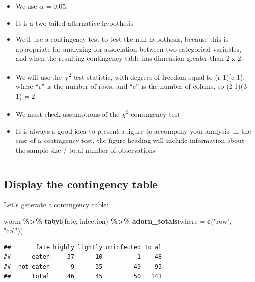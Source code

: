 \documentclass[
]{book}
\newenvironment{Shaded}{\begin{snugshade}}{\end{snugshade}}
\newcommand{\AttributeTok}[1]{\textcolor[rgb]{0.13,0.29,0.53}{#1}}
\newcommand{\FunctionTok}[1]{\textcolor[rgb]{0.13,0.29,0.53}{\textbf{#1}}}
\newcommand{\NormalTok}[1]{#1}
\newcommand{\SpecialCharTok}[1]{\textcolor[rgb]{0.81,0.36,0.00}{\textbf{#1}}}
\newcommand{\StringTok}[1]{\textcolor[rgb]{0.31,0.60,0.02}{#1}}
\providecommand{\tightlist}{%
  \setlength{\itemsep}{0pt}\setlength{\parskip}{0pt}}
\begin{document}
\begin{itemize}
\tightlist
\item
  We use \(\alpha\) = 0.05.\\
\item
  It is a two-tailed alternative hypothesis\\
\item
  We'll use a contingency test to test the null hypothesis, because this is appropriate for analyzing for association between two categorical variables, and when the resulting contingency table has dimension greater than 2 x 2.\\
\item
  We will use the \(\chi\)\textsuperscript{2} test statistic, with degrees of freedom equal to (r-1)(c-1), where ``r'' is the number of rows, and ``c'' is the number of colums, so (2-1)(3-1) = 2.\\
\item
  We must check assumptions of the \(\chi\)\textsuperscript{2} contingency test
\item
  It is always a good idea to present a figure to accompany your analysis; in the case of a contingency test, the figure heading will include information about the sample size / total number of observations
\end{itemize}

\begin{center}\rule{0.5\linewidth}{0.5pt}\end{center}

\subsection{Display the contingency table}\label{showwormcont}

Let's generate a contingency table:

\begin{Shaded}
\begin{Highlighting}[]
\NormalTok{worm }\SpecialCharTok{\%\textgreater{}\%}
  \FunctionTok{tabyl}\NormalTok{(fate, infection) }\SpecialCharTok{\%\textgreater{}\%}
  \FunctionTok{adorn\_totals}\NormalTok{(}\AttributeTok{where =} \FunctionTok{c}\NormalTok{(}\StringTok{"row"}\NormalTok{, }\StringTok{"col"}\NormalTok{))}
\end{Highlighting}
\end{Shaded}

\begin{verbatim}
##       fate highly lightly uninfected Total
##      eaten     37      10          1    48
##  not eaten      9      35         49    93
##      Total     46      45         50   141
\end{verbatim}
\end{document}
